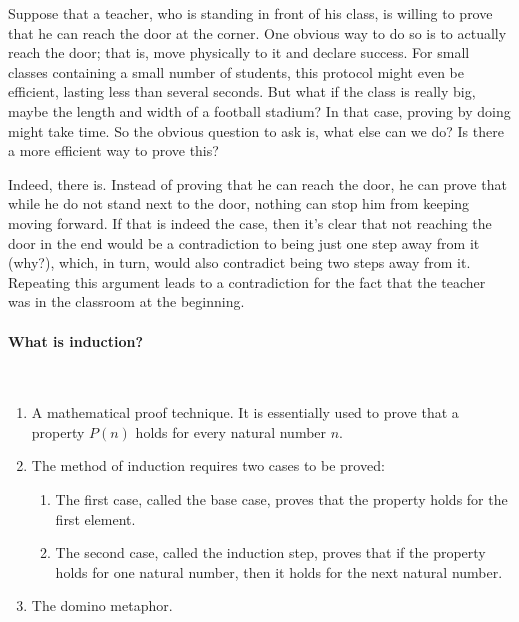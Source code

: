 Suppose that a teacher, who is standing in front of his class, is willing to prove that he can reach the door at the corner. One obvious way to do so is to actually reach the door; that is, move physically to it and declare success. For small classes containing a small number of students, this protocol might even be efficient, lasting less than several seconds. But what if the class is really big, maybe the length and width of a football stadium? In that case, proving by doing might take time. So the obvious question to ask is, what else can we do? Is there a more efficient way to prove this?

Indeed, there is. Instead of proving that he can reach the door, he can prove that while he do not stand next to the door, nothing can stop him from keeping moving forward. If that is indeed the case, then it's clear that not reaching the door in the end would be a contradiction to being just one step away from it (why?), which, in turn, would also contradict being two steps away from it. Repeating this argument leads to a contradiction for the fact that the teacher was in the classroom at the beginning.

\paragraph{What is induction?}~\begin{enumerate}
    \item A mathematical proof technique. It is essentially used to prove that a property \(P(n)\) holds for every natural number \(n\).
    \item The method of induction requires two cases to be proved:
    \begin{enumerate}
        \item The first case, called the base case, proves that the property holds for the first element.
        \item The second case, called the induction step, proves that if the property holds for one natural number, then it holds for the next natural number.
    \end{enumerate}
    \item The domino metaphor. 
\end{enumerate}

